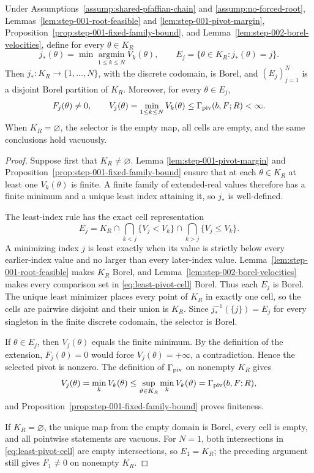 \begin{proposition}
\label{prop:step-002-selector-partition}
Under Assumptions~\ref{assump:shared-pfaffian-chain} and
\ref{assump:no-forced-root}, Lemmas~\ref{lem:step-001-root-feasible} and
\ref{lem:step-001-pivot-margin},
Proposition~\ref{prop:step-001-fixed-family-bound}, and
Lemma~\ref{lem:step-002-borel-velocities}, define for every
$\theta\in K_R$
\[
j_*(\theta)=\min\operatorname*{argmin}_{1\leq k\leq N}V_k(\theta),
\qquad
E_j=\{\theta\in K_R:j_*(\theta)=j\}.
\]
Then $j_*:K_R\to\{1,\ldots,N\}$, with the discrete codomain, is Borel, and
$(E_j)_{j=1}^N$ is a disjoint Borel partition of $K_R$.  Moreover, for every
$\theta\in E_j$,
\[
F_j(\theta)\neq0,
\qquad
V_j(\theta)=\min_{1\leq k\leq N}V_k(\theta)
\leq\Gamma_{\rm piv}(b,F;R)<\infty.
\]
When $K_R=\varnothing$, the selector is the empty map, all cells are empty,
and the same conclusions hold vacuously.
\end{proposition}

\begin{proof}
Suppose first that $K_R\neq\varnothing$.  Lemma
\ref{lem:step-001-pivot-margin} and
Proposition~\ref{prop:step-001-fixed-family-bound} ensure that at each
$\theta\in K_R$ at least one $V_k(\theta)$ is finite.  A finite family of
extended-real values therefore has a finite minimum and a unique least index
attaining it, so $j_*$ is well-defined.

The least-index rule has the exact cell representation
\begin{equation}
E_j
=K_R\cap\bigcap_{k<j}\{V_j<V_k\}
       \cap\bigcap_{k>j}\{V_j\leq V_k\}.
\label{eq:least-pivot-cell}
\end{equation}
A minimizing index $j$ is least exactly when its value is strictly below
every earlier-index value and no larger than every later-index value.
Lemma~\ref{lem:step-001-root-feasible} makes $K_R$ Borel, and
Lemma~\ref{lem:step-002-borel-velocities} makes every comparison set in
\eqref{eq:least-pivot-cell} Borel.  Thus each $E_j$ is Borel.  The unique
least minimizer places every point of $K_R$ in exactly one cell, so the cells
are pairwise disjoint and their union is $K_R$.  Since
$j_*^{-1}(\{j\})=E_j$ for every singleton in the finite discrete codomain,
the selector is Borel.

If $\theta\in E_j$, then $V_j(\theta)$ equals the finite minimum.  By the
definition of the extension, $F_j(\theta)=0$ would force
$V_j(\theta)=+\infty$, a contradiction.  Hence the selected pivot is
nonzero.  The definition of $\Gamma_{\rm piv}$ on nonempty $K_R$ gives
\[
V_j(\theta)=\min_kV_k(\theta)
\leq\sup_{\vartheta\in K_R}\min_kV_k(\vartheta)
=\Gamma_{\rm piv}(b,F;R),
\]
and Proposition~\ref{prop:step-001-fixed-family-bound} proves finiteness.

If $K_R=\varnothing$, the unique map from the empty domain is Borel, every
cell is empty, and all pointwise statements are vacuous.  For $N=1$, both
intersections in \eqref{eq:least-pivot-cell} are empty intersections, so
$E_1=K_R$; the preceding argument still gives $F_1\neq0$ on nonempty
$K_R$.
\end{proof}

